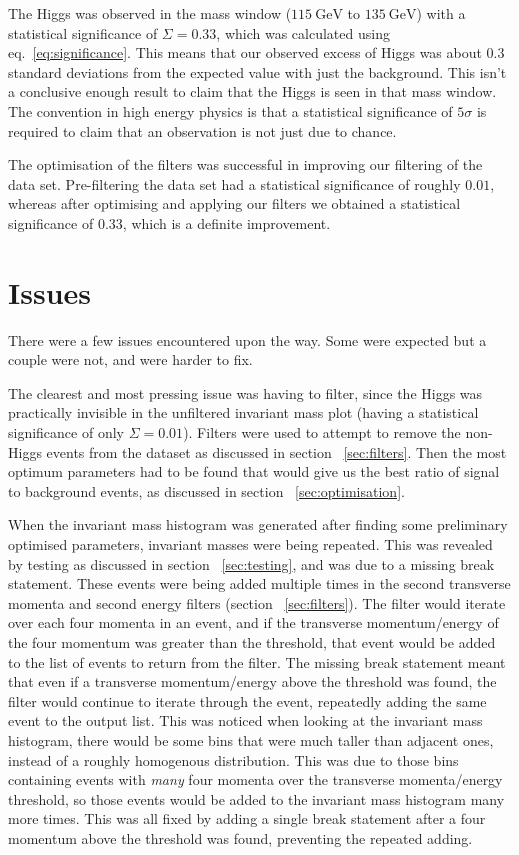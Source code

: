 \documentclass[11pt]{amsart}
\begin{document}
\begin{multicols}{2}
The Higgs was observed in the mass window ($\SI{115}{\giga\electronvolt}$ to $\SI{135}{\giga\electronvolt}$) with a statistical significance of $\Sigma = 0.33$, which was calculated using eq.~\ref{eq:significance}. This means that our observed excess of Higgs was about 0.3 standard deviations from the expected value with just the background. This isn't a conclusive enough result to claim that the Higgs is seen in that mass window. The convention in high energy physics is that a statistical significance of $5 \sigma$ is required to claim that an observation is not just due to chance. \cite{5sigma}

The optimisation of the filters was successful in improving our filtering of the data set. Pre-filtering the data set had a statistical significance of roughly $0.01$, whereas after optimising and applying our filters we obtained a statistical significance of $0.33$, which is a definite improvement.

\section{Issues}
\label{sec:issues}

There were a few issues encountered upon the way. Some were expected but a couple were not, and were harder to fix.

The clearest and most pressing issue was having to filter, since the Higgs was practically invisible in the unfiltered invariant mass plot (having a statistical significance of only $\Sigma = 0.01$). Filters were used to attempt to remove the non-Higgs events from the dataset as discussed in section ~\ref{sec:filters}. Then the most optimum parameters had to be found that would give us the best ratio of signal to background events, as discussed in section ~\ref{sec:optimisation}.

When the invariant mass histogram was generated after finding some preliminary optimised parameters, invariant masses were being repeated. This was revealed by testing as discussed in section ~\ref{sec:testing}, and was due to a missing break statement. These events were being added multiple times in the second transverse momenta and second energy filters (section ~\ref{sec:filters}). The filter would iterate over each four momenta in an event, and if the transverse momentum/energy of the four momentum was greater than the threshold, that event would be added to the list of events to return from the filter. The missing break statement meant that even if a transverse momentum/energy above the threshold was found, the filter would continue to iterate through the event, repeatedly adding the same event to the output list. This was noticed when looking at the invariant mass histogram, there would be some bins that were much taller than adjacent ones, instead of a roughly homogenous distribution. This was due to those bins containing events with \textit{many} four momenta over the transverse momenta/energy threshold, so those events would be added to the invariant mass histogram many more times. This was all fixed by adding a single break statement after a four momentum above the threshold was found, preventing the repeated adding.


\end{multicols}
\end{document}
